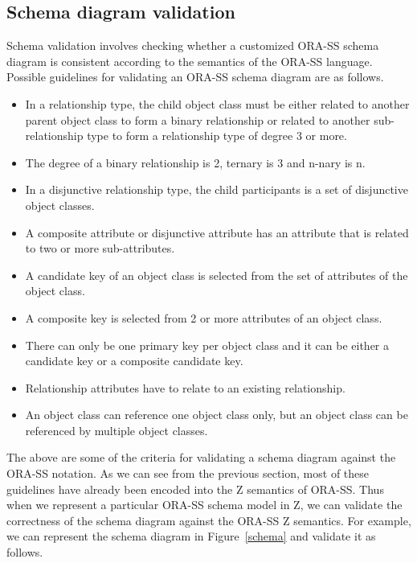 \documentclass{entcs}
\begin{document}
\subsection{Schema diagram validation}
Schema validation involves checking whether a customized ORA-SS
schema diagram is consistent according to the semantics of the
ORA-SS language. Possible guidelines for validating an ORA-SS
schema diagram are as follows.
\begin{itemize}
 \item In a relationship type, the child object class must be either related to another
parent object class to form a binary relationship or related to
another sub-relationship type to form a relationship type of
degree 3 or more.
 \item The degree of a binary relationship is 2, ternary is 3 and
 n-nary is n.
 \item In a disjunctive relationship type, the child participants
is a set of disjunctive object classes.
 \item A composite attribute or disjunctive attribute has an attribute that is
 related to two or more sub-attributes.
 \item A candidate key of an object class is selected from the
 set of attributes of the object class.
 \item A composite key is selected from 2 or more attributes of an object class.
 \item There can only be one primary key per object class and it can be
either a candidate key or a composite candidate key.
 \item  Relationship attributes have to relate to an existing
relationship.
 \item An object class can reference one object class only, but an
 object class can be referenced by multiple object classes.
\end{itemize}
The above are some of the criteria for validating a schema diagram
against the ORA-SS notation. As we can see from the previous
section, most of these guidelines have already been encoded into
the Z semantics of ORA-SS. Thus when we represent a particular
ORA-SS schema model in Z, we can validate the correctness of the
schema diagram against the ORA-SS Z semantics. For example, we can
represent the schema diagram in Figure~\ref{schema} and validate
it as follows.
\end{document}
